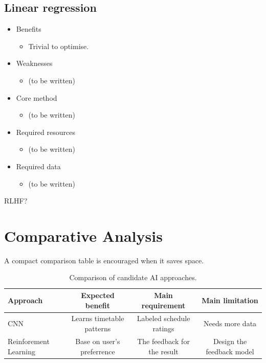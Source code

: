 \documentclass{article}
\begin{document}
\subsection{Linear regression}
\begin{itemize}
  \item Benefits
    \begin{itemize}
      \item Trivial to optimise.
    \end{itemize}
  \item Weaknesses
    \begin{itemize}
      \item (to be written)
    \end{itemize}
  \item Core method
    \begin{itemize}
      \item (to be written)
    \end{itemize}
  \item Required resources
    \begin{itemize}
      \item (to be written)
    \end{itemize}
  \item Required data
    \begin{itemize}
      \item (to be written)
    \end{itemize}
\end{itemize}

RLHF?

\section{Comparative Analysis}

A compact comparison table is encouraged when it saves space.
\begin{table}[t]
  \centering
  \caption{Comparison of candidate AI approaches.}\label{tab:approach-comparison}
  \begin{tabular}{lccc}
    \toprule
    Approach & Expected benefit & Main requirement & Main limitation \\
    \midrule
    CNN & Learns timetable patterns & Labeled schedule ratings & Needs more data \\
    Reinforement Learning & Base on user's preferrence & The feedback for the result & Design the feedback model \\
    \bottomrule
  \end{tabular}
\end{table}
\end{document}
